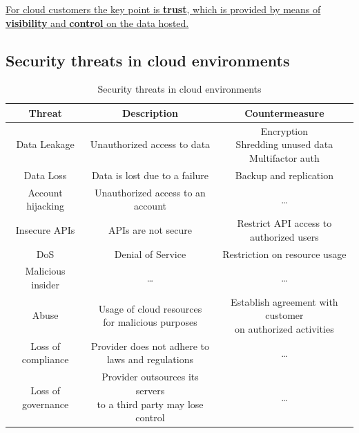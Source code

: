 \begin{center}
   \ul{For cloud customers the key point is \textbf{trust}, which is provided by means of \textbf{visibility} and \textbf{control} on the data hosted.}
\end{center}

\newpage
\subsection{Security threats in cloud environments}
\begin{table}[htbp]
   \centering
   \begin{tabular}{|c|c|c|}
      \hline
      \textbf{Threat} & \textbf{Description} & \textbf{Countermeasure} \\
      \hline
      Data Leakage & Unauthorized access to data & \shortstack{
         Encryption\\
         Shredding unused data\\
         Multifactor auth
      } \\
      \hline
      Data Loss & Data is lost due to a failure & Backup and replication \\
      \hline
      Account hijacking & Unauthorized access to an account & \dots\\
      \hline
      Insecure APIs & APIs are not secure & \shortstack{Restrict API access to\\ authorized users}\\
      \hline
      DoS & Denial of Service & Restriction on resource usage\\
      \hline
      Malicious insider & \dots & \dots \\
      \hline
      Abuse & \shortstack{Usage of cloud resources\\ for malicious purposes} & \shortstack{Establish agreement with customer\\ on authorized activities} \\
      \hline
      Loss of compliance & \shortstack{Provider does not adhere to\\ laws and regulations} & \dots \\
      \hline
      Loss of governance & \shortstack{Provider outsources its servers \\to a third party may lose control} & \dots \\
      \hline
      
   \end{tabular}
   \caption{Security threats in cloud environments}
   \label{tab:securitythreats_cloud}
\end{table}

